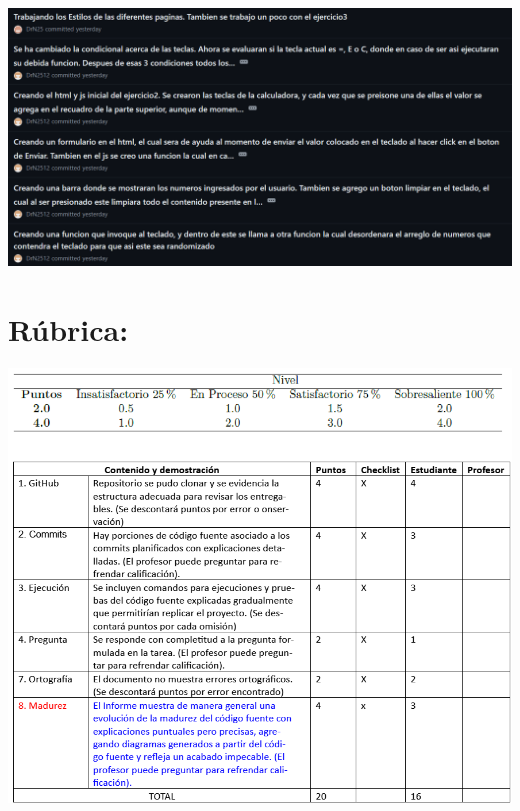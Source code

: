 \documentclass{article}
\begin{document}
\includegraphics[width=\textwidth]{img/13.png}
\section{Rúbrica:}




\includegraphics[width=\textwidth]{img/rubrica.png}
\end{document}
